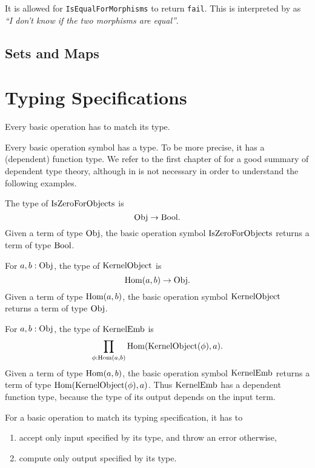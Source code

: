 \begin{remark}
 It is allowed for \texttt{IsEqualForMorphisms} to return \texttt{fail}. This is interpreted by \CapPkg as
 \textit{``I don't know if the two morphisms are equal''}.
\end{remark}


\subsection{\GAP Sets and \GAP Maps}

\section{Typing Specifications}

\begin{specification}
 Every basic operation has to match its type.
\end{specification}

Every basic operation symbol has a type. To be more precise, it has a (dependent) function type.
We refer to the first chapter of \cite{hottbook} for a good summary of dependent type theory,
although in is not necessary in order to understand the following examples.

\begin{example}\label{example:simple_typing}
 The type of $\mathrm{IsZeroForObjects}$ is
 \[
  \mathrm{Obj} \rightarrow \mathrm{Bool}.
 \]
 Given a term of type $\mathrm{Obj}$, the basic operation symbol $\mathrm{IsZeroForObjects}$ returns a term of type $\mathrm{Bool}$.
\end{example}

\begin{example}\label{example:simple_typing_with_morphism_input}
 For $a,b: \mathrm{Obj}$, the type of $\mathrm{KernelObject}$ is
 \[
  \operatorname{\mathrm{Hom}}(a,b) \rightarrow \mathrm{Obj}.
 \]
 Given a term of type $\operatorname{\mathrm{Hom}}(a,b)$, the basic operation symbol $\mathrm{KernelObject}$ returns a term of type $\mathrm{Obj}$.
\end{example}

\begin{example}\label{example:dependent_typing}
 For $a,b: \mathrm{Obj}$, the type of $\mathrm{KernelEmb}$ is
 \[
  \prod_{\phi: \operatorname{\mathrm{Hom}}(a,b)} \operatorname{\mathrm{Hom}}( \mathrm{KernelObject}(\phi), a ).
 \]
 Given a term of type $\operatorname{\mathrm{Hom}}(a,b)$, the basic operation symbol $\mathrm{KernelEmb}$ returns a term of type $\operatorname{\mathrm{Hom}}( \mathrm{KernelObject}(\phi), a )$.
 Thus $\mathrm{KernelEmb}$ has a dependent function type, because the type of its output depends on the input term.
\end{example}

For a basic operation to match its typing specification, it has to
\begin{enumerate}
 \item accept only input specified by its type, and throw an error otherwise,
 \item compute only output specified by its type.
\end{enumerate}

